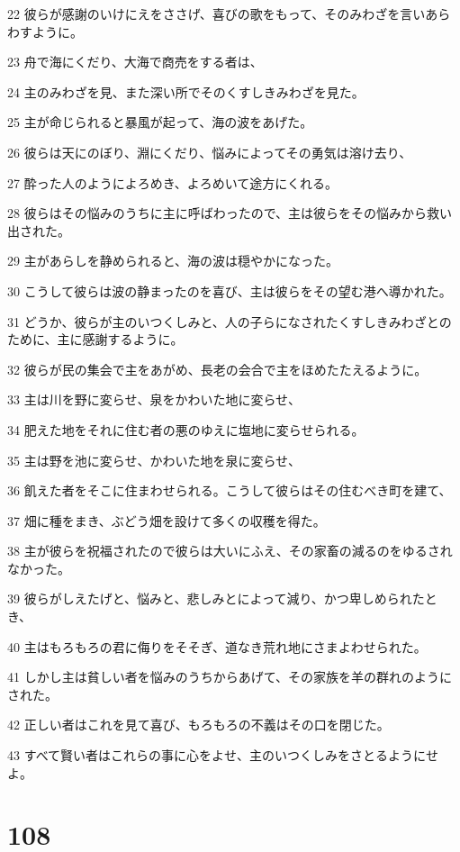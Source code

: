 \par 22 彼らが感謝のいけにえをささげ、喜びの歌をもって、そのみわざを言いあらわすように。
\par 23 舟で海にくだり、大海で商売をする者は、
\par 24 主のみわざを見、また深い所でそのくすしきみわざを見た。
\par 25 主が命じられると暴風が起って、海の波をあげた。
\par 26 彼らは天にのぼり、淵にくだり、悩みによってその勇気は溶け去り、
\par 27 酔った人のようによろめき、よろめいて途方にくれる。
\par 28 彼らはその悩みのうちに主に呼ばわったので、主は彼らをその悩みから救い出された。
\par 29 主があらしを静められると、海の波は穏やかになった。
\par 30 こうして彼らは波の静まったのを喜び、主は彼らをその望む港へ導かれた。
\par 31 どうか、彼らが主のいつくしみと、人の子らになされたくすしきみわざとのために、主に感謝するように。
\par 32 彼らが民の集会で主をあがめ、長老の会合で主をほめたたえるように。
\par 33 主は川を野に変らせ、泉をかわいた地に変らせ、
\par 34 肥えた地をそれに住む者の悪のゆえに塩地に変らせられる。
\par 35 主は野を池に変らせ、かわいた地を泉に変らせ、
\par 36 飢えた者をそこに住まわせられる。こうして彼らはその住むべき町を建て、
\par 37 畑に種をまき、ぶどう畑を設けて多くの収穫を得た。
\par 38 主が彼らを祝福されたので彼らは大いにふえ、その家畜の減るのをゆるされなかった。
\par 39 彼らがしえたげと、悩みと、悲しみとによって減り、かつ卑しめられたとき、
\par 40 主はもろもろの君に侮りをそそぎ、道なき荒れ地にさまよわせられた。
\par 41 しかし主は貧しい者を悩みのうちからあげて、その家族を羊の群れのようにされた。
\par 42 正しい者はこれを見て喜び、もろもろの不義はその口を閉じた。
\par 43 すべて賢い者はこれらの事に心をよせ、主のいつくしみをさとるようにせよ。

\chapter{108}

